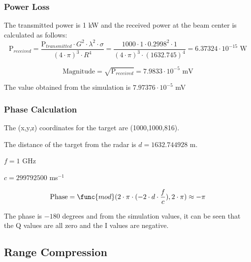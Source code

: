 \documentclass[thmsa,a4paper,ukenglish]{report}
\begin{document}
\smallskip {}

\smallskip

\subsubsection{Power Loss}

\smallskip The transmitted power is 1 kW and the received power at the beam
center is calculated as follows:\smallskip 
\[
\text{P}_{received}=\frac{\text{P}_{transmitted}\cdot G^{2}\cdot \lambda
^{2}\cdot \sigma }{(4\cdot \pi )^{3}\cdot R^{4}}=\frac{1000\cdot 1\cdot
0.2998^{2}\cdot 1}{(4\cdot \pi )^{3}\cdot (1632.745)^{4}}=6.37324\cdot
10^{-15}\text{ W} 
\]

\smallskip 
\[
\text{Magnitude}=\sqrt{\text{P}_{received}}=7.9833\cdot 10^{-5}\text{ mV} 
\]

\smallskip

The value obtained from the simulation is $7.97376\cdot 10^{-5}$ mV

\subsubsection{\protect\smallskip Phase Calculation}

\smallskip \smallskip The (x,y,z) coordinates for the target are
(1000,1000,816).

\smallskip The distance of the target from the radar is $d=1632.744928$ m$.$

\smallskip $f=1$ GHz

\smallskip $c=299792500$ ms$^{-1}$

\smallskip

\[
\text{Phase}=\func{mod}(2\cdot \pi \cdot (-2\cdot d\cdot \frac{f}{c}),2\cdot
\pi )\approx -\pi 
\]

\smallskip

The phase is $-180$ degrees and from the simulation values, it can be seen
that the Q values are all zero and the I values are negative.

\subsection{\protect\smallskip \protect\smallskip Range Compression}
\end{document}
